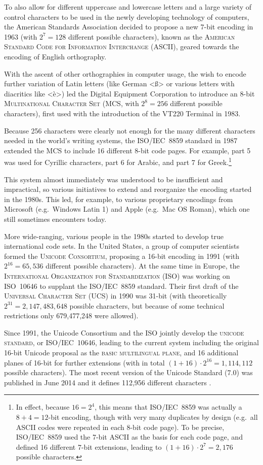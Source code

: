 To also allow for different uppercase and lowercase letters and a large variety
of control characters to be used in the newly developing technology of
computers, the American Standards Association decided to propose a new 7-bit
encoding in 1963 (with $2^7 = 128$ different possible characters), known as the
\textsc{American Standard Code for Information Interchange} (ASCII), geared
towards the encoding of English orthography.

With the ascent of other orthographies in computer usage, the wish to encode
further variation of Latin letters (like German <ß> or various letters with
diacritics like <è>) led the Digital Equipment Corporation to introduce an 8-bit
\textsc{Multinational Character Set} (MCS, with $2^8 = 256$ different possible
characters), first used with the introduction of the {\small VT}220 Terminal in
1983.

Because 256 characters were clearly not enough for the many different characters
needed in the world's writing systems, the ISO/IEC~8859 standard in 1987
extended the MCS to include 16 different 8-bit code pages. For example, part 5
was used for Cyrillic characters, part 6 for Arabic, and part 7 for
Greek.\footnote{In effect, because $16 = 2^4$, this means that ISO/IEC~8859 was
actually a $8+4=12$-bit encoding, though with very many duplicates by design
(e.g.~all ASCII codes were repeated in each 8-bit code page). To be precise,
ISO/IEC~8859 used the 7-bit ASCII as the basis for each code page, and defined
16 different 7-bit extensions, leading to $(1+16)\cdot{2^7} = 2,176$ possible
characters.}

This system almost immediately was understood to be insufficient and
impractical, so various initiatives to extend and reorganize the encoding
started in the 1980s. This led, for example, to various proprietary encodings
from Microsoft (e.g.~Windows Latin 1) and Apple (e.g.~Mac OS Roman), which one
still sometimes encounters today.

More wide-ranging, various people in the 1980s started to develop true
international code sets. In the United States, a group of computer scientists
formed the \textsc{Unicode Consortium}, proposing a 16-bit encoding in 1991
(with $2^{16} = 65,536$ different possible characters). At the same time in
Europe, the \textsc{International Organization for Standardization} (ISO) was
working on ISO~10646 to supplant the ISO/IEC~8859 standard. Their first draft of
the \textsc{Universal Character Set} (UCS) in 1990 was 31-bit (with
theoretically $2^{31} = 2,147,483,648$ possible characters, but because of some
technical restrictions only 679,477,248 were allowed).

Since 1991, the Unicode Consortium and the ISO jointly develop the
\textsc{unicode standard}, or ISO/IEC~10646, leading to the current system
including the original 16-bit Unicode proposal as the \textsc{basic multilingual
plane}, and 16 additional planes of 16-bit for further extensions (with in total
$(1+16) \cdot 2^{16} = 1,114,112$ possible characters). The most recent version
of the Unicode Standard (7.0) was published in June 2014 and it defines 112,956
different characters \citep{Unicode2014}.
